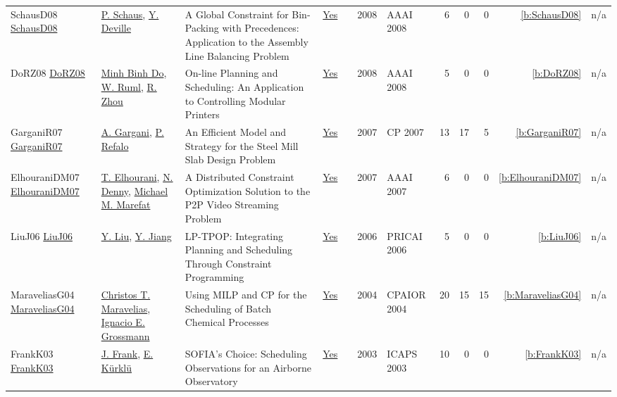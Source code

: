 {\begin{longtable}{>{\raggedright\arraybackslash}p{3cm}>{\raggedright\arraybackslash}p{6cm}>{\raggedright\arraybackslash}p{6.5cm}rrrp{2.5cm}rrrrr}
SchausD08 \href{http://www.aaai.org/Library/AAAI/2008/aaai08-058.php}{SchausD08} & \hyperref[auth:a148]{P. Schaus}, \hyperref[auth:a152]{Y. Deville} & A Global Constraint for Bin-Packing with Precedences: Application to the Assembly Line Balancing Problem & \href{../works/SchausD08.pdf}{Yes} & \cite{SchausD08} & 2008 & AAAI 2008 & 6 & 0 & 0 & \ref{b:SchausD08} & n/a\\
DoRZ08 \href{http://www.aaai.org/Library/AAAI/2008/aaai08-253.php}{DoRZ08} & \hyperref[auth:a1370]{Minh Binh Do}, \hyperref[auth:a1371]{W. Ruml}, \hyperref[auth:a1372]{R. Zhou} & On-line Planning and Scheduling: An Application to Controlling Modular Printers & \href{../works/DoRZ08.pdf}{Yes} & \cite{DoRZ08} & 2008 & AAAI 2008 & 5 & 0 & 0 & \ref{b:DoRZ08} & n/a\\
GarganiR07 \href{https://doi.org/10.1007/978-3-540-74970-7_8}{GarganiR07} & \hyperref[auth:a255]{A. Gargani}, \hyperref[auth:a256]{P. Refalo} & An Efficient Model and Strategy for the Steel Mill Slab Design Problem & \href{../works/GarganiR07.pdf}{Yes} & \cite{GarganiR07} & 2007 & CP 2007 & 13 & 17 & 5 & \ref{b:GarganiR07} & n/a\\
ElhouraniDM07 \href{http://www.aaai.org/Library/AAAI/2007/aaai07-213.php}{ElhouraniDM07} & \hyperref[auth:a1367]{T. Elhourani}, \hyperref[auth:a1368]{N. Denny}, \hyperref[auth:a1369]{Michael M. Marefat} & A Distributed Constraint Optimization Solution to the {P2P} Video Streaming Problem & \href{../works/ElhouraniDM07.pdf}{Yes} & \cite{ElhouraniDM07} & 2007 & AAAI 2007 & 6 & 0 & 0 & \ref{b:ElhouraniDM07} & n/a\\
LiuJ06 \href{https://doi.org/10.1007/11801603_92}{LiuJ06} & \hyperref[auth:a660]{Y. Liu}, \hyperref[auth:a661]{Y. Jiang} & {LP-TPOP:} Integrating Planning and Scheduling Through Constraint Programming & \href{../works/LiuJ06.pdf}{Yes} & \cite{LiuJ06} & 2006 & PRICAI 2006 & 5 & 0 & 0 & \ref{b:LiuJ06} & n/a\\
MaraveliasG04 \href{https://doi.org/10.1007/978-3-540-24664-0_1}{MaraveliasG04} & \hyperref[auth:a384]{Christos T. Maravelias}, \hyperref[auth:a385]{Ignacio E. Grossmann} & Using {MILP} and {CP} for the Scheduling of Batch Chemical Processes & \href{../works/MaraveliasG04.pdf}{Yes} & \cite{MaraveliasG04} & 2004 & CPAIOR 2004 & 20 & 15 & 15 & \ref{b:MaraveliasG04} & n/a\\
FrankK03 \href{http://www.aaai.org/Library/ICAPS/2003/icaps03-023.php}{FrankK03} & \hyperref[auth:a382]{J. Frank}, \hyperref[auth:a383]{E. K{\"{u}}rkl{\"{u}}} & SOFIA's Choice: Scheduling Observations for an Airborne Observatory & \href{../works/FrankK03.pdf}{Yes} & \cite{FrankK03} & 2003 & ICAPS 2003 & 10 & 0 & 0 & \ref{b:FrankK03} & n/a\\

\end{longtable}}
